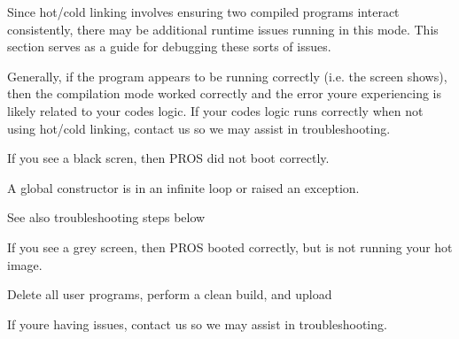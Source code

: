 Since hot/cold linking involves ensuring two compiled programs interact consistently, there may be additional runtime issues running in this mode. This section serves as a guide for debugging these sorts of issues.

Generally, if the program appears to be running correctly (i.\+e. the screen shows), then the compilation mode worked correctly and the error you\textquotesingle{}re experiencing is likely related to your code\textquotesingle{}s logic. If your code\textquotesingle{}s logic runs correctly when not using hot/cold linking, contact us so we may assist in troubleshooting.

If you see a black scren, then P\+R\+OS did not boot correctly.


\begin{DoxyItemize}
\item A global constructor is in an infinite loop or raised an exception.
\item See also troubleshooting steps below
\end{DoxyItemize}

If you see a grey screen, then P\+R\+OS booted correctly, but is not running your hot image.


\begin{DoxyItemize}
\item Delete all user programs, perform a clean build, and upload
\end{DoxyItemize}

If you\textquotesingle{}re having issues, contact us so we may assist in troubleshooting. 